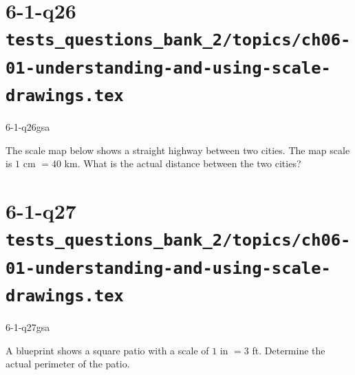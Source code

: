 \documentclass[12pt, fleqn, openany]{studyGuide}
\begin{document}
\newpage
\section*{6-1-q26 \hfill \normalsize\texttt{tests\_questions\_bank\_2/topics/ch06-01-understanding-and-using-scale-drawings.tex}}
\begin{practiceQuestion}{6-1-q26}{gsa}
\begin{questionText}
The scale map below shows a straight highway between two cities. The map scale is $1$ cm $= 40$ km. What is the actual distance between the two cities?

\begin{center}
\end{center}
\end{questionText}
\end{practiceQuestion}

\newpage
\section*{6-1-q27 \hfill \normalsize\texttt{tests\_questions\_bank\_2/topics/ch06-01-understanding-and-using-scale-drawings.tex}}
\begin{practiceQuestion}{6-1-q27}{gsa}
\begin{questionText}
A blueprint shows a square patio with a scale of $1$ in $= 3$ ft. Determine the actual perimeter of the patio.

\begin{center}
\end{center}
\end{questionText}
\end{practiceQuestion}
\end{document}
